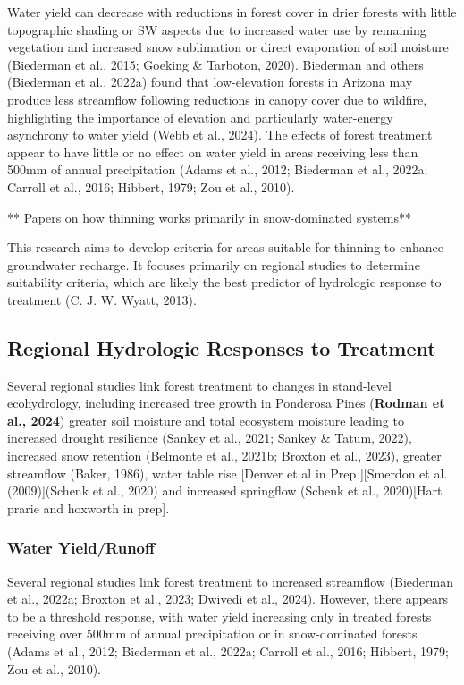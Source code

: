 \documentclass[
]{agujournal2019}
\begin{document}
Water yield can decrease with reductions in forest cover in drier
forests with little topographic shading or SW aspects due to increased
water use by remaining vegetation and increased snow sublimation or
direct evaporation of soil moisture (Biederman et al., 2015; Goeking \&
Tarboton, 2020). Biederman and others (Biederman et al., 2022a) found
that low-elevation forests in Arizona may produce less streamflow
following reductions in canopy cover due to wildfire, highlighting the
importance of elevation and particularly water-energy asynchrony to
water yield (Webb et al., 2024). The effects of forest treatment appear
to have little or no effect on water yield in areas receiving less than
500mm of annual precipitation (Adams et al., 2012; Biederman et al.,
2022a; Carroll et al., 2016; Hibbert, 1979; Zou et al., 2010).

** Papers on how thinning works primarily in snow-dominated systems**

This research aims to develop criteria for areas suitable for thinning
to enhance groundwater recharge. It focuses primarily on regional
studies to determine suitability criteria, which are likely the best
predictor of hydrologic response to treatment (C. J. W. Wyatt, 2013).

\subsection{Regional Hydrologic Responses to
Treatment}\label{regional-hydrologic-responses-to-treatment}

Several regional studies link forest treatment to changes in stand-level
ecohydrology, including increased tree growth in Ponderosa Pines
(\textbf{Rodman et al., 2024}) greater soil moisture and total ecosystem
moisture leading to increased drought resilience (Sankey et al., 2021;
Sankey \& Tatum, 2022), increased snow retention (Belmonte et al.,
2021b; Broxton et al., 2023), greater streamflow (Baker, 1986), water
table rise {[}Denver et al in Prep {]}{[}Smerdon et al. (2009){]}(Schenk
et al., 2020) and increased springflow (Schenk et al., 2020){[}Hart
prarie and hoxworth in prep{]}.

\subsubsection{Water Yield/Runoff}\label{water-yieldrunoff}

Several regional studies link forest treatment to increased streamflow
(Biederman et al., 2022a; Broxton et al., 2023; Dwivedi et al., 2024).
However, there appears to be a threshold response, with water yield
increasing only in treated forests receiving over 500mm of annual
precipitation or in snow-dominated forests (Adams et al., 2012;
Biederman et al., 2022a; Carroll et al., 2016; Hibbert, 1979; Zou et
al., 2010).
\end{document}
